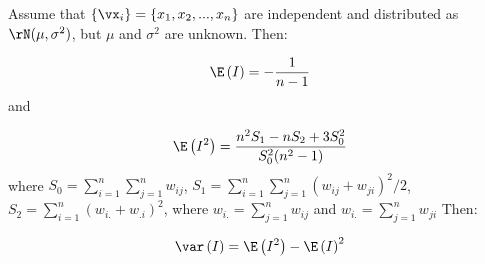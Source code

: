 \documentclass[english,12pt]{book}\usepackage[]{graphicx}\usepackage[]{xcolor}
\begin{document}
\begin{theorem}\label{teo:Moran_normal}
Assume that $\left\lbrace \vx_i\right\rbrace = \left\lbrace x_1, x_2,..., x_n\right\rbrace$ are independent and distributed as $\rN(\mu, \sigma^2)$, but $\mu$ and $\sigma^2$ are unknown. Then:

\begin{equation}
\E\left(I\right) = - \frac{1}{n - 1} 
\end{equation}
%
and

\begin{equation}
\E\left(I^2\right) = \frac{n^2S_1 - nS_2 + 3S_0^2}{S_0^2(n^2 - 1)}
\end{equation}
%
where $S_0=\sum_{i = 1}^n\sum_{j=1}^nw_{ij}$, $S_1= \sum_{i = 1}^n\sum_{j = 1}^n(w_{ij} + w_{ji})^2/2$, $S_2 = \sum_{i = 1}^n(w_{i.} + w_{.i})^2$, where $w_{i.}= \sum_{j = 1}^nw_{ij}$ and $w_{i.}=\sum_{j = 1}^nw_{ji}$
Then:

\begin{equation}
\var\left(I\right)=\E\left(I^2\right) - \E\left(I\right)^2
\end{equation}
\end{theorem}
\end{document}
